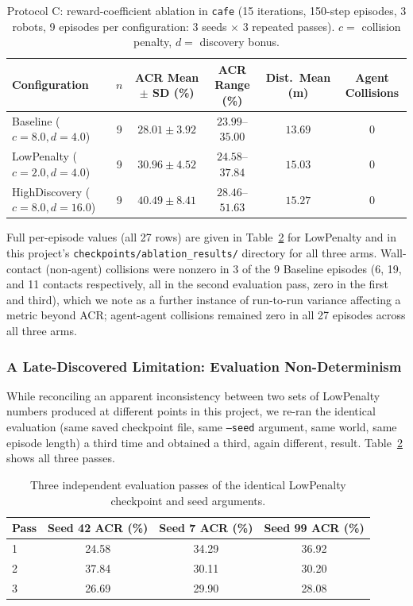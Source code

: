 \documentclass[11pt]{article}
\begin{document}
\begin{table}[h]
\centering
\footnotesize
\setlength{\tabcolsep}{3.5pt}
\caption{Protocol C: reward-coefficient ablation in \texttt{cafe} (15 iterations, 150-step episodes, 3 robots, 9 episodes per configuration: 3 seeds $\times$ 3 repeated passes). $c{=}$ collision penalty, $d{=}$ discovery bonus.}
\label{tab:ablation}
\begin{tabular}{lccccc}
\toprule
Configuration & $n$ & ACR Mean $\pm$ SD (\%) & ACR Range (\%) & Dist.\ Mean (m) & Agent Collisions \\
\midrule
Baseline ($c{=}8.0, d{=}4.0$)       & 9 & $28.01 \pm 3.92$ & $23.99$--$35.00$ & $13.69$ & 0 \\
LowPenalty ($c{=}2.0, d{=}4.0$)     & 9 & $30.96 \pm 4.52$ & $24.58$--$37.84$ & $15.03$ & 0 \\
HighDiscovery ($c{=}8.0, d{=}16.0$) & 9 & $40.49 \pm 8.41$ & $28.46$--$51.63$ & $15.27$ & 0 \\
\bottomrule
\end{tabular}
\vspace{2pt}
{\small Full per-episode values (all 27 rows) are given in
Table~\ref{tab:nondeterminism} for LowPenalty and in this project's
\texttt{checkpoints/ablation\_results/} directory for all three arms.
Wall-contact (non-agent) collisions were nonzero in 3 of the 9 Baseline
episodes (6, 19, and 11 contacts respectively, all in the second
evaluation pass, zero in the first and third), which we note as a further
instance of run-to-run variance affecting a metric beyond ACR; agent-agent
collisions remained zero in all 27 episodes across all three arms.}
\end{table}

\subsubsection{A Late-Discovered Limitation: Evaluation Non-Determinism}
\label{sec:nondeterminism}
While reconciling an apparent inconsistency between two sets of LowPenalty
numbers produced at different points in this project, we re-ran the
identical evaluation (same saved checkpoint file, same \texttt{--seed}
argument, same world, same episode length) a third time and obtained a
third, again different, result. Table~\ref{tab:nondeterminism} shows all
three passes.

\begin{table}[h]
\centering
\small
\caption{Three independent evaluation passes of the identical LowPenalty checkpoint and seed arguments.}
\label{tab:nondeterminism}
\begin{tabular}{lccc}
\toprule
Pass & Seed 42 ACR (\%) & Seed 7 ACR (\%) & Seed 99 ACR (\%) \\
\midrule
1 & 24.58 & 34.29 & 36.92 \\
2 & 37.84 & 30.11 & 30.20 \\
3 & 26.69 & 29.90 & 28.08 \\
\bottomrule
\end{tabular}
\end{table}
\end{document}

